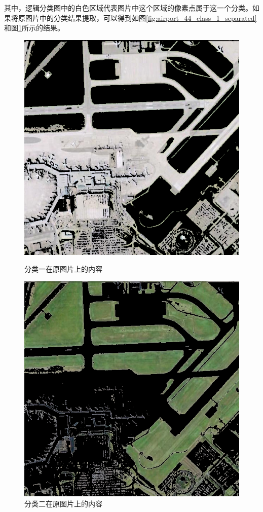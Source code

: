 其中，逻辑分类图中的白色区域代表图片中这个区域的像素点属于这一个分类。如果将原图片中的分类结果提取，可以得到如图\ref{fig:airport_44_class_1_separated}和图\ref{fig:airport_44_class_2_separated}所示的结果。
\begin{figure}[H]
	\centering
	\begin{minipage}{0.45\linewidth}
		\includegraphics[width=\linewidth]{figure/airport_44_Class_01_Separated.png}
		\caption{分类一在原图片上的内容}
		\label{fig:airport_44_class_1_separated}
	\end{minipage}
	\begin{minipage}{0.45\linewidth}
		\includegraphics[width=\linewidth]{figure/airport_44_Class_02_Separated.png}
		\caption{分类二在原图片上的内容}
		\label{fig:airport_44_class_2_separated}
	\end{minipage}
\end{figure}

